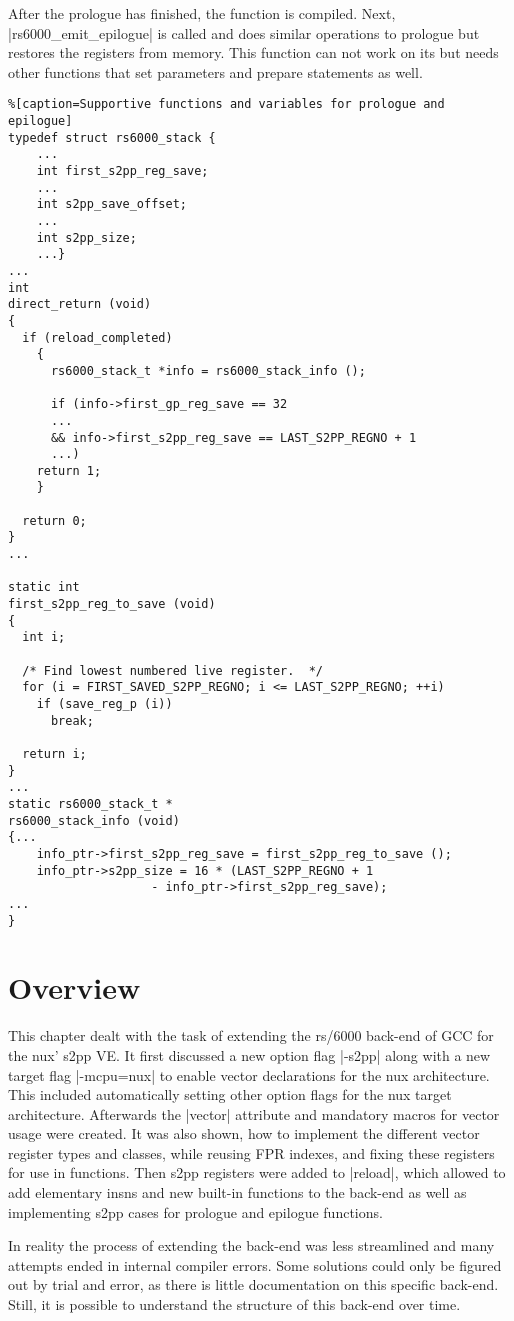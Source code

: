 After the prologue has finished, the function is compiled.
Next, |rs6000_emit_epilogue| is called and does similar operations to prologue but restores the registers from memory.
This function can not work on its but needs other functions that set parameters and prepare statements as well.
\begin{lstlisting}%[caption=Supportive functions and variables for prologue and epilogue]
typedef struct rs6000_stack {
    ...
    int first_s2pp_reg_save;
    ...
    int s2pp_save_offset;
    ...
    int s2pp_size;
    ...}
...
int
direct_return (void)
{
  if (reload_completed)
    {
      rs6000_stack_t *info = rs6000_stack_info ();

      if (info->first_gp_reg_save == 32
      ...
      && info->first_s2pp_reg_save == LAST_S2PP_REGNO + 1
      ...)
    return 1;
    }

  return 0;
}
...

static int
first_s2pp_reg_to_save (void)
{
  int i;

  /* Find lowest numbered live register.  */
  for (i = FIRST_SAVED_S2PP_REGNO; i <= LAST_S2PP_REGNO; ++i)
    if (save_reg_p (i))
      break;

  return i;
}
...
static rs6000_stack_t *
rs6000_stack_info (void)
{...
    info_ptr->first_s2pp_reg_save = first_s2pp_reg_to_save ();
    info_ptr->s2pp_size = 16 * (LAST_S2PP_REGNO + 1
                    - info_ptr->first_s2pp_reg_save);
...
}
\end{lstlisting}

\section{Overview}
This chapter dealt with the task of extending the \ac{rs/6000} back-end of \ac{GCC} for the nux' \ac{s2pp} \ac{VE}.
It first discussed a new option flag |-s2pp| along with a new target flag |-mcpu=nux| to enable vector declarations for the nux architecture.
This included automatically setting other option flags for the nux target architecture.
Afterwards the |vector| attribute and mandatory macros for vector usage were created.
It was also shown, how to implement the different vector register types and classes, while reusing \ac{FPR} indexes, and fixing these registers for use in functions.
Then \ac{s2pp} registers were added to |reload|, which allowed to add elementary insns and new built-in functions to the back-end as well as implementing \ac{s2pp} cases for prologue and epilogue functions.

In reality the process of extending the back-end was less streamlined and many attempts ended in internal compiler errors.
Some solutions could only be figured out by trial and error, as there is little documentation on this specific back-end.
Still, it is possible to understand the structure of this back-end over time.



